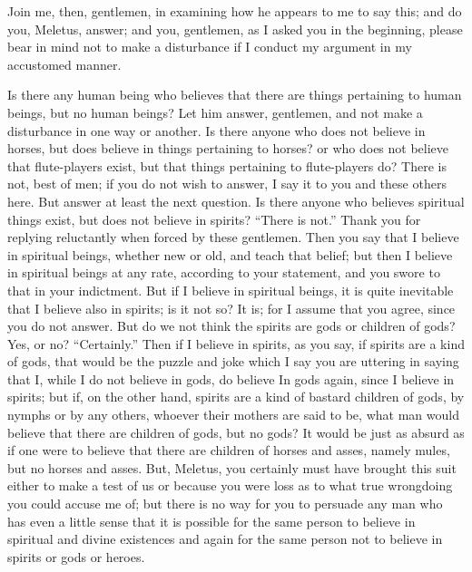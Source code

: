 Join me, then, gentlemen, in examining how he appears to me to say this; and do you, Meletus, answer;  and you, gentlemen, as I asked you in the beginning, please bear in mind not to make a disturbance if I conduct my argument in my accustomed manner.

Is there any human being who believes that there are things pertaining to human beings, but no human beings? Let him answer, gentlemen, and not make a disturbance in one way or another. Is there anyone who does not believe in horses, but does believe in things pertaining to horses? or who does not believe that flute-players exist, but that things pertaining to flute-players do? There is not, best of men; if you do not wish to answer, I say it to you and these others here. But answer at least  the next question. Is there anyone who believes spiritual things exist, but does not believe in spirits? “There is not.” Thank you for replying reluctantly when forced by these gentlemen. Then you say that I believe in spiritual beings, whether new or old, and teach that belief; but then I believe in spiritual beings at any rate, according to your statement, and you swore to that in your indictment. But if I believe in spiritual beings, it is quite inevitable that I believe also in spirits; is it not so? It is; for I assume that you agree, since you do not answer. But do we not think the spirits are  gods or children of gods? Yes, or no? “Certainly.” Then if I believe in spirits, as you say, if spirits are a kind of gods, that would be the puzzle and joke which I say you are uttering in saying that I, while I do not believe in gods, do believe In gods again, since I believe in spirits; but if, on the other hand, spirits are a kind of bastard children of gods, by nymphs or by any others, whoever their mothers are said to be, what man would believe that there are children of gods, but no gods? It would be just as absurd  as if one were to believe that there are children of horses and asses, namely mules, but no horses and asses. But, Meletus, you certainly must have brought this suit either to make a test of us or because you were loss as to what true wrongdoing you could accuse me of; but there is no way for you to persuade any man who has even a little sense that it is possible for the same person to believe in spiritual and divine existences and again for the same person not to believe in spirits or gods or  heroes.

